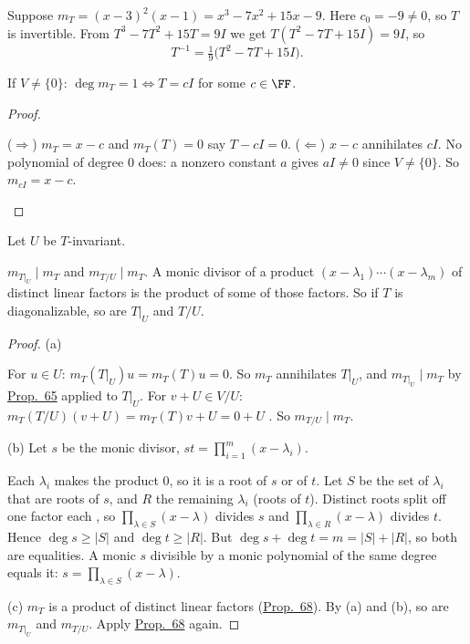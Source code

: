 \documentclass[10pt]{scrartcl}
\begin{document}
\begin{example*}
  Suppose $m_T=(x-3)^2(x-1)=x^3-7x^2+15x-9$. Here $c_0=-9\ne0$, so $T$ is invertible. From $T^3-7T^2+15T=9I$ we get $T(T^2-7T+15I)=9I$, so
  \[ T^{-1}=\tfrac19\bigl(T^2-7T+15I\bigr). \]
\end{example*}

\begin{proposition*}\hypertarget{name-f2-degree-one-m4}{}\label{name-f2-degree-one-m4}
  If $V\ne\{0\}$: $\deg m_T=1\iff T=cI$ for some $c\in\FF$.
\end{proposition*}
\begin{proof}
  \begin{steps}
    \ii ($\Rightarrow$) $m_T=x-c$ and $m_T(T)=0$ say $T-cI=0$.
    \ii ($\Leftarrow$) $x-c$ annihilates $cI$. No polynomial of degree $0$ does: a nonzero constant $a$ gives $aI\ne0$ since $V\ne\{0\}$. So $m_{cI}=x-c$.
  \end{steps}
\end{proof}

\begin{proposition*}\hypertarget{name-f3-restrictions-and-quotients-ex-60}{}\label{name-f3-restrictions-and-quotients-ex-60}
  Let $U$ be $T$-invariant.
  \begin{enumerate}[(a)]
    \ii $m_{T|_U}\mid m_T$ and $m_{T/U}\mid m_T$.
    \ii A monic divisor of a product $(x-\lambda_1)\cdots(x-\lambda_m)$ of distinct linear factors is the product of some of those factors.
    \ii So if $T$ is diagonalizable, so are $T|_U$ and $T/U$.
  \end{enumerate}
\end{proposition*}
\begin{proof}
  (a)
  \begin{steps}
    \ii For $u\in U$: $m_T(T|_U)u=m_T(T)u=0$. So $m_T$ annihilates $T|_U$, and $m_{T|_U}\mid m_T$ by \hyperref[prop-65]{Prop.~65} applied to $T|_U$.
    \ii For $v+U\in V/U$: $m_T(T/U)(v+U)=m_T(T)v+U=0+U$ . So $m_{T/U}\mid m_T$.
  \end{steps}
  (b) Let $s$ be the monic divisor, $st=\prod_{i=1}^m(x-\lambda_i)$.
  \begin{steps}
    \ii Each $\lambda_i$ makes the product $0$, so it is a root of $s$ or of $t$. Let $S$ be the set of $\lambda_i$ that are roots of $s$, and $R$ the remaining $\lambda_i$ (roots of $t$).
    \ii Distinct roots split off one factor each , so $\prod_{\lambda\in S}(x-\lambda)$ divides $s$ and $\prod_{\lambda\in R}(x-\lambda)$ divides $t$. Hence $\deg s\ge|S|$ and $\deg t\ge|R|$.
    \ii But $\deg s+\deg t=m=|S|+|R|$, so both are equalities. A monic $s$ divisible by a monic polynomial of the same degree equals it: $s=\prod_{\lambda\in S}(x-\lambda)$.
  \end{steps}
  (c) $m_T$ is a product of distinct linear factors (\hyperref[prop-68]{Prop.~68}). By (a) and (b), so are $m_{T|_U}$ and $m_{T/U}$. Apply \hyperref[prop-68]{Prop.~68} again.
\end{proof}
\end{document}
